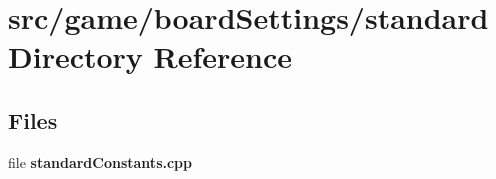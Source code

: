\section{src/game/board\-Settings/standard Directory Reference}
\label{dir_a6733be713435febbd1da3c2d2917380}
\subsection*{Files}
\begin{DoxyCompactItemize}
\item 
file {\bfseries standard\-Constants.\-cpp}
\end{DoxyCompactItemize}
